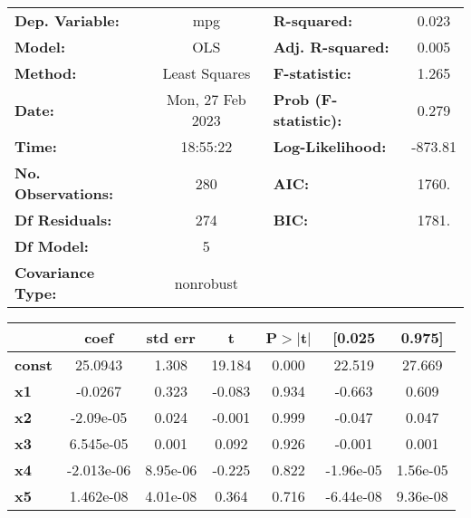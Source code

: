 \begin{center}
\begin{tabular}{lclc}
\toprule
\textbf{Dep. Variable:}    &       mpg        & \textbf{  R-squared:         } &     0.023   \\
\textbf{Model:}            &       OLS        & \textbf{  Adj. R-squared:    } &     0.005   \\
\textbf{Method:}           &  Least Squares   & \textbf{  F-statistic:       } &     1.265   \\
\textbf{Date:}             & Mon, 27 Feb 2023 & \textbf{  Prob (F-statistic):} &    0.279    \\
\textbf{Time:}             &     18:55:22     & \textbf{  Log-Likelihood:    } &   -873.81   \\
\textbf{No. Observations:} &         280      & \textbf{  AIC:               } &     1760.   \\
\textbf{Df Residuals:}     &         274      & \textbf{  BIC:               } &     1781.   \\
\textbf{Df Model:}         &           5      & \textbf{                     } &             \\
\textbf{Covariance Type:}  &    nonrobust     & \textbf{                     } &             \\
\bottomrule
\end{tabular}
\begin{tabular}{lcccccc}
               & \textbf{coef} & \textbf{std err} & \textbf{t} & \textbf{P$> |$t$|$} & \textbf{[0.025} & \textbf{0.975]}  \\
\midrule
\textbf{const} &      25.0943  &        1.308     &    19.184  &         0.000        &       22.519    &       27.669     \\
\textbf{x1}    &      -0.0267  &        0.323     &    -0.083  &         0.934        &       -0.663    &        0.609     \\
\textbf{x2}    &    -2.09e-05  &        0.024     &    -0.001  &         0.999        &       -0.047    &        0.047     \\
\textbf{x3}    &    6.545e-05  &        0.001     &     0.092  &         0.926        &       -0.001    &        0.001     \\
\textbf{x4}    &   -2.013e-06  &     8.95e-06     &    -0.225  &         0.822        &    -1.96e-05    &     1.56e-05     \\
\textbf{x5}    &    1.462e-08  &     4.01e-08     &     0.364  &         0.716        &    -6.44e-08    &     9.36e-08     \\

\end{tabular}
\end{center}
